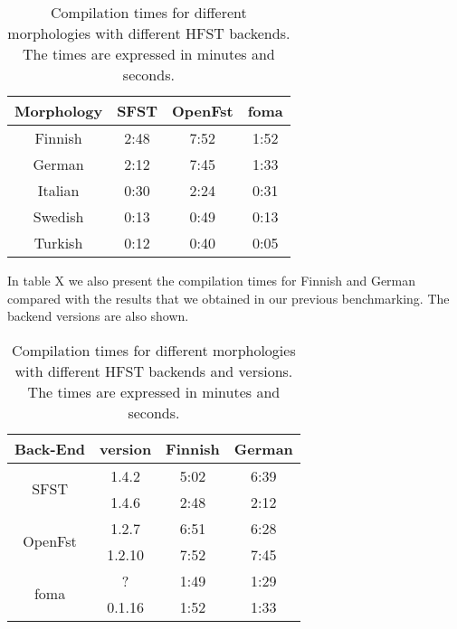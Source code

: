 \documentclass{llncs}
\begin{document}
\begin{table}
  \caption{Compilation times for different morphologies with
    different HFST backends. The times are expressed in minutes and seconds.}
  \label{tab:compilation_times}
  \begin{tabular}{ c  c  c  c }
    \hline
    Morphology & SFST & OpenFst & foma \\ \hline
    Finnish & 2:48 & 7:52 & 1:52 \\ \hline
    German & 2:12 & 7:45 & 1:33 \\ \hline
    Italian & 0:30 & 2:24 & 0:31 \\ \hline
    Swedish & 0:13 & 0:49 & 0:13 \\ \hline
    Turkish & 0:12 & 0:40 & 0:05 \\ \hline
    \end{tabular}
\end{table}


In table X we also present the compilation times for Finnish and German compared
with the results that we obtained in our previous benchmarking. The backend
versions are also shown.

\begin{table}
  \caption{Compilation times for different morphologies with
    different HFST backends and versions. 
    The times are expressed in minutes and seconds.}
  \label{tab:compilation_times_versions}
  \begin{tabular}{ c  c  c  c }
\hline
  Back-End                 & version  & Finnish  & German \\ \hline
  \multirow{2}{*}{SFST}    & 1.4.2    & 5:02     & 6:39 \\
                           & 1.4.6    & 2:48     & 2:12 \\ \hline
  \multirow{2}{*}{OpenFst} & 1.2.7    & 6:51     & 6:28 \\
                           & 1.2.10   & 7:52     & 7:45 \\ \hline
  \multirow{2}{*}{foma}    & ?        & 1:49     & 1:29 \\
                           & 0.1.16   & 1:52     & 1:33 \\
\hline
  \end{tabular}

\end{table}
\end{document}
